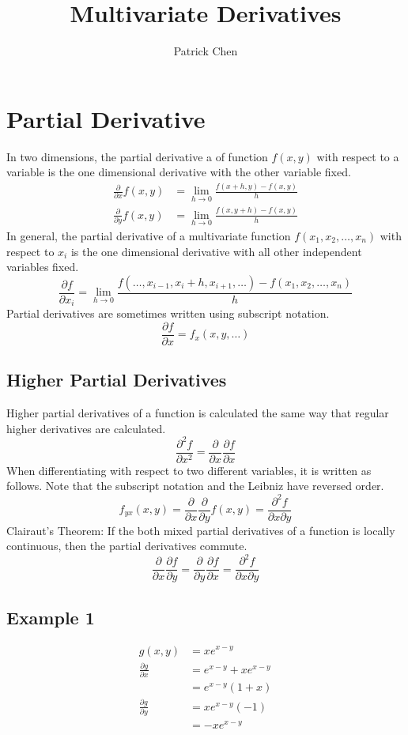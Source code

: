 \documentclass{article}
\title{Multivariate Derivatives}
\author{Patrick Chen}
\date{}
\theoremstyle{mytheoremstyle}
\theoremstyle{mytheoremstyle}
\theoremstyle{myproblemstyle}
\begin{document}
    \maketitle
    \section*{Partial Derivative}
    In two dimensions, the partial derivative a of function $f(x,y)$ with
    respect to a variable is the one dimensional derivative with the other
    variable fixed.
    \begin{align*}
        \frac{\partial}{\partial x} f(x,y) &= \lim_{h\to 0} \frac{f(x+h,y)-f(x,y)}{h} \\
        \frac{\partial}{\partial y} f(x,y) &= \lim_{h\to 0} \frac{f(x,y+h)-f(x,y)}{h}
    \end{align*}
    In general, the partial derivative of a multivariate function
    $f(x_1,x_2,\dots,x_n)$ with respect to $x_i$ is the one dimensional
    derivative with all other independent variables fixed.
    \[
        \frac{\partial f}{\partial x_i} = \lim_{h\to 0} \frac{f(\dots,x_{i-1},x_i + h, x_{i+1}, \dots) - f(x_1,x_2,\dots,x_n)}{h}
    \]
    Partial derivatives are sometimes written using subscript notation.
    \[
        \frac{\partial f}{\partial x} = f_x(x,y,\dots)
    \]

    \subsection*{Higher Partial Derivatives}
    Higher partial derivatives of a function is calculated the same way that
    regular higher derivatives are calculated.
    \[
        \frac{\partial^2 f}{\partial x^2} = \frac{\partial  }{\partial x} \frac{\partial f}{\partial x}
    \]
    When differentiating with respect to two different variables, it is written
    as follows. Note that the subscript notation and the Leibniz have reversed
    order.
    \[
        f_{yx}(x,y) = \frac{\partial}{\partial x} \frac{\partial}{\partial y}
        f(x,y) = \frac{\partial^2 f}{\partial x \partial y}
    \]
    Clairaut's Theorem: If the both mixed partial derivatives of a function is
    locally continuous, then the partial derivatives commute.
    \[
        \frac{\partial}{\partial x} \frac{\partial f}{\partial y} =
        \frac{\partial}{\partial y} \frac{\partial f}{\partial x} =
        \frac{\partial^2 f}{\partial x \partial y}
    \]

    \subsection*{Example 1}
    \begin{align*}
        g(x,y) &= xe^{x-y} \\
        \frac{\partial g}{\partial x} &= e^{x-y} + xe^{x-y} \\
                                      &= e^{x-y}(1+x) \\
        \frac{\partial g}{\partial y} &= xe^{x-y} (-1) \\
                                      &= -xe^{x-y}
    \end{align*}
\end{document}
